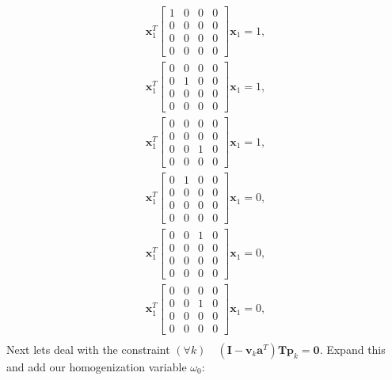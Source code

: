 \documentclass{article}
\begin{document}
\begin{align}
    \mathbf{x}_1^T  \begin{bmatrix} 1 & 0 & 0 & 0 \\ 0 & 0 & 0 & 0 \\ 0 & 0 & 0 & 0 \\ 0 & 0 & 0 & 0 \end{bmatrix} \mathbf{x}_1 = 1,\\
    \mathbf{x}_1^T  \begin{bmatrix} 0 & 0 & 0 & 0 \\ 0 & 1 & 0 & 0 \\ 0 & 0 & 0 & 0 \\ 0 & 0 & 0 & 0 \end{bmatrix} \mathbf{x}_1 = 1,\\
    \mathbf{x}_1^T  \begin{bmatrix} 0 & 0 & 0 & 0 \\ 0 & 0 & 0 & 0 \\ 0 & 0 & 1 & 0 \\ 0 & 0 & 0 & 0 \end{bmatrix} \mathbf{x}_1 = 1,\\
    \mathbf{x}_1^T  \begin{bmatrix} 0 & 1 & 0 & 0 \\ 0 & 0 & 0 & 0 \\ 0 & 0 & 0 & 0 \\ 0 & 0 & 0 & 0 \end{bmatrix} \mathbf{x}_1 = 0,\\
    \mathbf{x}_1^T  \begin{bmatrix} 0 & 0 & 1 & 0 \\ 0 & 0 & 0 & 0 \\ 0 & 0 & 0 & 0 \\ 0 & 0 & 0 & 0 \end{bmatrix} \mathbf{x}_1 = 0,\\
    \mathbf{x}_1^T  \begin{bmatrix} 0 & 0 & 0 & 0 \\ 0 & 0 & 1 & 0 \\ 0 & 0 & 0 & 0 \\ 0 & 0 & 0 & 0 \end{bmatrix} \mathbf{x}_1 = 0,\\
\end{align}
Next lets deal with the constraint $(\forall k) \quad (\mathbf{I} - \mathbf{v}_k \mathbf{a}^T) \mathbf{T} \mathbf{p}_k = \mathbf{0}$. Expand this and add our homogenization variable $\omega_0$:
\end{document}
